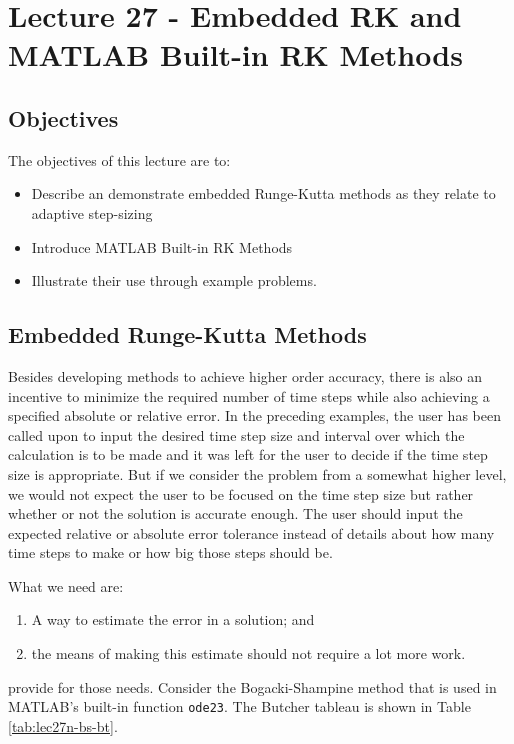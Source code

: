 \chapter{Lecture 27 - Embedded RK and MATLAB Built-in RK Methods}
\label{ch:lec27n}
\section{Objectives}
The objectives of this lecture are to:
\begin{itemize}
\item Describe an demonstrate embedded Runge-Kutta methods as they relate to adaptive step-sizing
\item Introduce MATLAB Built-in RK Methods
\item Illustrate their use through example problems.
\end{itemize}
\setcounter{lstannotation}{0}

\section{Embedded Runge-Kutta Methods}
Besides developing methods to achieve higher order accuracy, there is also an incentive to minimize the required number of time steps while also achieving a specified absolute or relative error.  In the preceding examples, the user has been called upon to input the desired time step size and interval over which the calculation is to be made and it was left for the user to decide if the time step size is appropriate.  But if we consider the problem from a somewhat higher level, we would not expect the user to be focused on the time step size but rather whether or not the solution is accurate enough.  The user should input the expected relative or absolute error tolerance instead of details about how many time steps to make or how big those steps should be.

What we need are:
\begin{enumerate}
\item A way to estimate the error in a solution; and
\item the means of making this estimate should not require a lot more work.
\end{enumerate}  

 provide for those needs.  Consider the Bogacki-Shampine method\cite{bogacki19893} that is used in MATLAB's built-in function \lstinline[style=myMatlab]{ode23}. The Butcher tableau is shown in Table \ref{tab:lec27n-bs-bt}.


